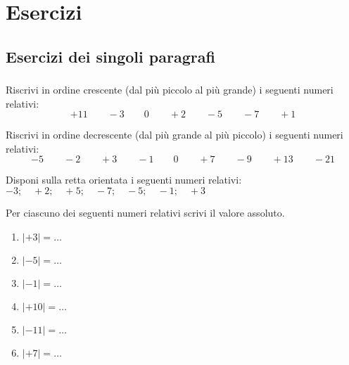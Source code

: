 
\section{Esercizi}

\subsection{Esercizi dei singoli paragrafi}

\subsubsection*{}


\begin{esercizio}
 \label{ese:2.1}
Riscrivi in ordine crescente (dal più piccolo al più grande) i seguenti 
numeri 
relativi:
\[+11\qquad-3\qquad0\qquad+2\qquad-5\qquad-7\qquad+1\]
\end{esercizio}

\begin{esercizio}
 \label{ese:2.2}
Riscrivi in ordine decrescente (dal più grande al più piccolo) i seguenti 
numeri 
relativi:
\[-5\qquad-2\qquad+3\qquad-1\qquad0\qquad+7\qquad-9\qquad+13\qquad-21\]
\end{esercizio}

\begin{esercizio}
 \label{ese:2.3}
Disponi sulla retta orientata i seguenti numeri relativi:
\(-3;\quad +2;\quad +5;\quad -7;\quad -5;\quad -1;\quad +3\)
\begin{center}
\esec
%  
\end{center}

\end{esercizio}

\begin{esercizio}
 \label{ese:2.4}
Per ciascuno dei seguenti numeri relativi scrivi il valore assoluto.
\begin{multicols}{3}
\begin{enumerate}[noitemsep, label=(\alph*)]
 \item \(|+3|=\ldots\)
 \item \(|-5|=\ldots\)
 \item \(|-1|=\ldots\)
 \item \(|+10|=\ldots\)
 \item \(|-11|=\ldots\)
 \item \(|+7|=\ldots\)
\end{enumerate}
\end{multicols}
\end{esercizio}

